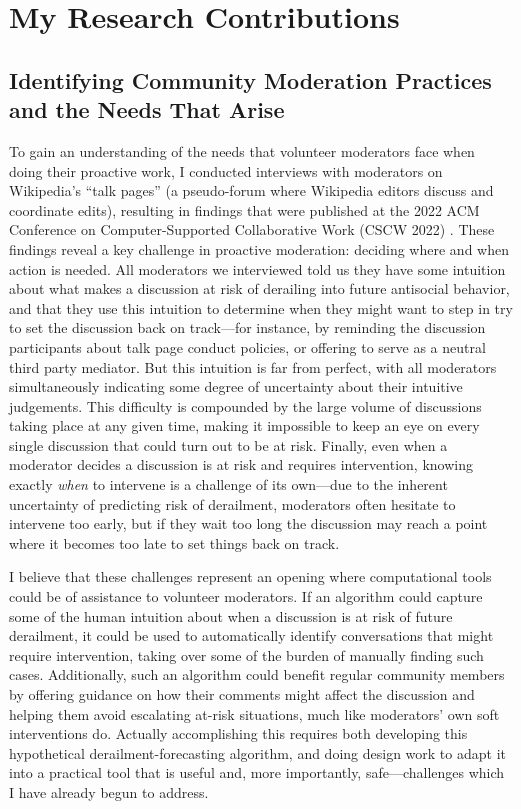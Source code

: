 \documentclass[11pt,letterpaper]{article}
\begin{document}
\section{My Research Contributions}

\subsection{Identifying Community Moderation Practices and the Needs That Arise}
To gain an understanding of the needs that volunteer moderators face when doing their proactive work, I conducted interviews with moderators on Wikipedia's ``talk pages'' (a pseudo-forum where Wikipedia editors discuss and coordinate edits), resulting in findings that were published at the 2022 ACM Conference on Computer-Supported Collaborative Work (CSCW 2022) \cite{schluger_proactive_2022}.
These findings reveal a key challenge in proactive moderation: deciding where and when action is needed.
All moderators we interviewed told us they have some intuition about what makes a discussion at risk of derailing into future antisocial behavior, and that they use this intuition to determine when they might want to step in try to set the discussion back on track---for instance, by reminding the discussion participants about talk page conduct policies, or offering to serve as a neutral third party mediator.
But this intuition is far from perfect, with all moderators simultaneously indicating some degree of uncertainty about their intuitive judgements.
This difficulty is compounded by the large volume of discussions taking place at any given time, making it impossible to keep an eye on every single discussion that could turn out to be at risk.
Finally, even when a moderator decides a discussion is at risk and requires intervention, knowing exactly \emph{when} to intervene is a challenge of its own---due to the inherent uncertainty of predicting risk of derailment, moderators often hesitate to intervene too early, but if they wait too long the discussion may reach a point where it becomes too late to set things back on track.%

I believe that these challenges represent an opening where computational tools could be of assistance to volunteer moderators.
If an algorithm could capture some of the human intuition about when a discussion is at risk of future derailment, it could be used to automatically identify conversations that might require intervention, taking over some of the burden of manually finding such cases.
Additionally, such an algorithm could benefit regular community members by offering guidance on how their comments might affect the discussion and helping them avoid escalating at-risk situations, much like moderators' own soft interventions do.
Actually accomplishing this requires both developing this hypothetical derailment-forecasting algorithm, and doing design work to adapt it into a practical tool that is useful and, more importantly, safe---challenges which I have already begun to address.
\end{document}
